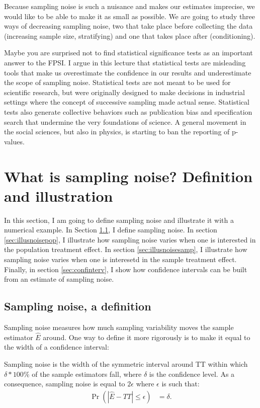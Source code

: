 \documentclass[]{book}
\theoremstyle{definition}
\theoremstyle{definition}
\theoremstyle{definition}
\theoremstyle{remark}
\let\BeginKnitrBlock\begin \let\EndKnitrBlock\end
\begin{document}
Because sampling noise is such a nuisance and makes our estimates imprecise, we would like to be able to make it as small as possible.
We are going to study three ways of decreasing sampling noise, two that take place before collecting the data (increasing sample size, stratifying) and one that takes place after (conditioning).

Maybe you are surprised not to find statistical significance tests as an important answer to the FPSI.
I argue in this lecture that statistical tests are misleading tools that make us overestimate the confidence in our results and underestimate the scope of sampling noise.
Statistical tests are not meant to be used for scientific research, but were originally designed to make decisions in industrial settings where the concept of successive sampling made actual sense.
Statistical tests also generate collective behaviors such as publication bias and specification search that undermine the very foundations of science.
A general movement in the social sciences, but also in physics, is starting to ban the reporting of p-values.

\hypertarget{sec:sampnoise}{%
\section{What is sampling noise? Definition and illustration}\label{sec:sampnoise}}

In this section, I am going to define sampling noise and illustrate it with a numerical example.
In Section \ref{sec:definitionnoise}, I define sampling noise.
In section \ref{sec:illusnoisepop}, I illustrate how sampling noise varies when one is interested in the population treatment effect.
In section \ref{sec:illusnoisesamp}, I illustrate how sampling noise varies when one is interesetd in the sample treatment effect.
Finally, in section \ref{sec:confinterv}, I show how confidence intervals can be built from an estimate of sampling noise.

\hypertarget{sec:definitionnoise}{%
\subsection{Sampling noise, a definition}\label{sec:definitionnoise}}

Sampling noise measures how much sampling variability moves the sample estimator \(\hat{E}\) around.
One way to define it more rigorously is to make it equal to the width of a confidence interval:

\BeginKnitrBlock{definition}[Sampling noise]
\protect\hypertarget{def:sampnoise}{}{\label{def:sampnoise} \iffalse (Sampling noise) \fi{} }Sampling noise is the width of the symmetric interval around TT within which \(\delta*100\)\% of the sample estimators fall, where \(\delta\) is the confidence level.
As a consequence, sampling noise is equal to \(2\epsilon\) where \(\epsilon\) is such that:
\begin{align*}
\Pr(|\hat{E}-TT|\leq\epsilon) &= \delta.
\end{align*}
\EndKnitrBlock{definition}
\end{document}
